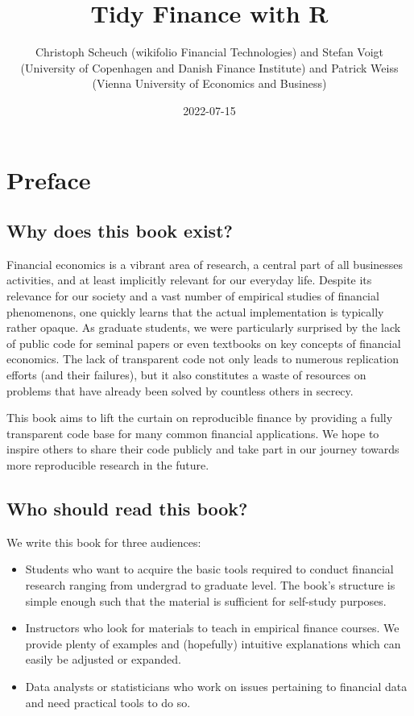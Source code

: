 \documentclass[
]{book}
\title{Tidy Finance with R}
\author{Christoph Scheuch (wikifolio Financial Technologies) and Stefan Voigt (University of Copenhagen and Danish Finance Institute) and Patrick Weiss (Vienna University of Economics and Business)}
\date{2022-07-15}
\providecommand{\tightlist}{%
  \setlength{\itemsep}{0pt}\setlength{\parskip}{0pt}}
\begin{document}
\maketitle

\setlength{\abovedisplayskip}{-5pt}
\setlength{\abovedisplayshortskip}{-5pt}

\mainmatter

{
\setcounter{tocdepth}{2}
\tableofcontents
}
\hypertarget{preface}{%
\chapter*{Preface}\label{preface}}


\hypertarget{why-does-this-book-exist}{%
\section*{Why does this book exist?}\label{why-does-this-book-exist}}


Financial economics is a vibrant area of research, a central part of all businesses activities, and at least implicitly relevant for our everyday life. Despite its relevance for our society and a vast number of empirical studies of financial phenomenons, one quickly learns that the actual implementation is typically rather opaque.
As graduate students, we were particularly surprised by the lack of public code for seminal papers or even textbooks on key concepts of financial economics. The lack of transparent code not only leads to numerous replication efforts (and their failures), but it also constitutes a waste of resources on problems that have already been solved by countless others in secrecy.

This book aims to lift the curtain on reproducible finance by providing a fully transparent code base for many common financial applications. We hope to inspire others to share their code publicly and take part in our journey towards more reproducible research in the future.

\hypertarget{who-should-read-this-book}{%
\section*{Who should read this book?}\label{who-should-read-this-book}}


We write this book for three audiences:

\begin{itemize}
\tightlist
\item
  Students who want to acquire the basic tools required to conduct financial research ranging from undergrad to graduate level. The book's structure is simple enough such that the material is sufficient for self-study purposes.
\item
  Instructors who look for materials to teach in empirical finance courses. We provide plenty of examples and (hopefully) intuitive explanations which can easily be adjusted or expanded.\\
\item
  Data analysts or statisticians who work on issues pertaining to financial data and need practical tools to do so.
\end{itemize}
\end{document}
